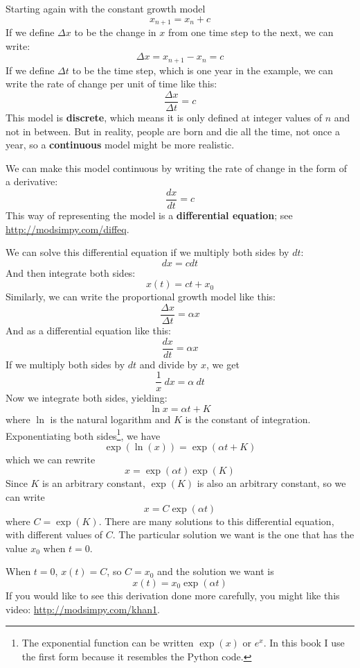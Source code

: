 \documentclass[12pt]{book}
\theoremstyle{exercise}
\begin{document}
Starting again with the constant growth model
%
\[ x_{n+1} = x_n + c \]
%
If we define $\Delta x$ to be the change in $x$ from one time step to the next, we can write:
%
\[ \Delta x = x_{n+1} - x_n = c \]
%
If we define $\Delta t$ to be the time step, which is one year in the example, we can write the rate of change per unit of time like this:
%
\[ \frac{\Delta x}{\Delta t} = c \]
%
This model is {\bf discrete}, which means it is only defined at integer values of $n$ and not in between.  But in reality, people are born and die all the time, not once a year, so a {\bf continuous} model might be more realistic.


We can make this model continuous by writing the rate of change in the form of a derivative:
%
\[ \frac{dx}{dt} = c \]
%
This way of representing the model is a {\bf differential equation}; see \url{http://modsimpy.com/diffeq}.


We can solve this differential equation if we multiply both sides by $dt$:
%
\[ dx = c dt \]
%
And then integrate both sides:
%
\[ x(t) = c t + x_0 \]
%
Similarly, we can write the proportional growth model like this:
%
\[ \frac{\Delta x}{\Delta t} = \alpha x \]
%
And as a differential equation like this:
%
\[ \frac{dx}{dt} = \alpha x \]
%
If we multiply both sides by $dt$ and divide by $x$, we get
%
\[ \frac{1}{x}~dx = \alpha~dt \] 
%
Now we integrate both sides, yielding:
%
\[ \ln x = \alpha t + K \]
%
where $\ln$ is the natural logarithm and $K$ is the constant of integration.  Exponentiating both sides\footnote{The exponential function can be written $\exp(x)$ or $e^x$.  In this book I use the first form because it resembles the Python code. }, we have
%
\[ \exp(\ln(x)) = \exp(\alpha t + K) \]
%
which we can rewrite
%
\[ x = \exp(\alpha t) \exp(K) \]
%
Since $K$ is an arbitrary constant, $\exp(K)$ is also an arbitrary constant, so we can write
%
\[ x = C \exp(\alpha t) \]
%
where $C = \exp(K)$.  There are many solutions to this differential equation, with different values of $C$.  The particular solution we want is the one that has the value $x_0$ when $t=0$. 

When $t=0$, $x(t) = C$, so $C = x_0$ and the solution we want is
%
\[ x(t) = x_0 \exp(\alpha t) \]
%
If you would like to see this derivation done more carefully, you might like this video: \url{http://modsimpy.com/khan1}.

\end{document}
